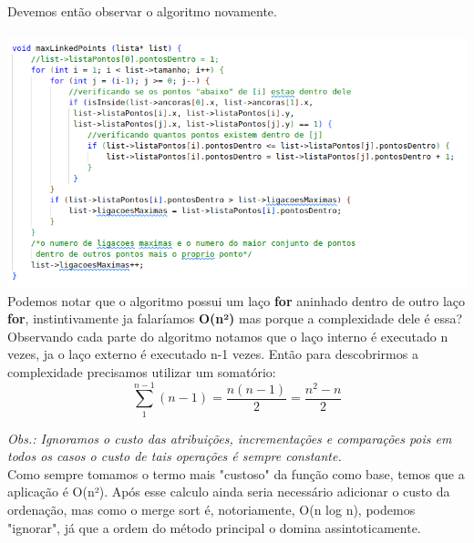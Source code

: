 \documentclass[12pt]{article}
\begin{document}
        Devemos então observar o algoritmo novamente.\\\\
        \includegraphics[width=1.0\linewidth]{Figuras/2.png}\\
        Podemos notar que o algoritmo possui um laço \textbf{for} aninhado dentro de outro laço 
        \textbf{for}, instintivamente ja falaríamos \textbf{O(n²)} mas porque a complexidade dele é
        essa?
        Observando cada parte do algoritmo notamos que o laço interno é executado n vezes, ja o laço
        externo é executado n-1 vezes. Então para descobrirmos a complexidade precisamos utilizar um 
        somatório:
        \[\sum_{1}^{n-1}(n-1) = \frac{n(n-1)}{2} = \frac{n^2-n}{2}\]
        
        \textit{Obs.: Ignoramos o custo das atribuições, incrementações e comparações pois em todos 
        os casos o custo de tais operações é sempre constante.}\\
        
        Como sempre tomamos o termo mais "custoso" da função como base, temos que a aplicação é O(n²). 
        Após esse calculo ainda seria necessário adicionar o custo da ordenação, mas como o merge sort é, 
        notoriamente, O(n log n), podemos "ignorar", já que a ordem do método principal o domina 
        assintoticamente.

    \newpage
\end{document}
